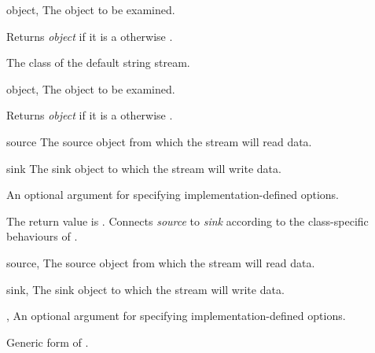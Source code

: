 \begin{optDefinition}
\begin{arguments}
  \item[object, \classref{object}] The object to be examined.
\end{arguments}
%
\result%
Returns {\em object\/} if it is a  otherwise \nil{}.

%
The class of the default string stream.

\begin{arguments}
    \item[object, \classref{object}] The object to be examined.
\end{arguments}
%
\result%
Returns {\em object\/} if it is a  otherwise \nil{}.


\begin{arguments}
    \item[source] The source object from which the stream will read data.
    \item[sink] The sink object to which the stream will write data.
    \item[\optional{options}] An optional argument for specifying
    implementation-defined options.
\end{arguments}
%
\result%
The return value is \nil{}.
%
\remarks%
Connects {\em source\/} to {\em sink\/} according to the class-specific
behaviours of .

\begin{genericargs}
    \item[source, \classref{object}] The source object from which the stream
    will read data.
    \item[sink, \classref{object}] The sink object to which the stream will
    write data.
    \item[\optional{options}, \classref{list}] An optional argument for
    specifying implementation-defined options.
\end{genericargs}
%
\remarks%
Generic form of .


\end{optDefinition}
